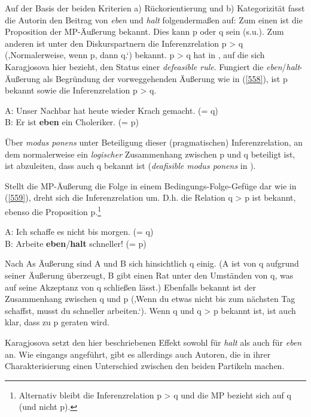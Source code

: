 Auf der Basis der beiden Kriterien a) Rückorientierung und b) Kategorizität fasst die Autorin den Beitrag von \textit{eben} und \textit{halt} folgendermaßen auf: Zum einen ist die Proposition der MP-Äußerung bekannt. Dies kann p oder q sein (s.u.). Zum anderen ist unter den Diskurspartnern die Inferenzrelation p > q (‚Normalerweise, wenn p, dann q.‘) bekannt. p > q hat in \citet{Asher1991}, auf die sich Karagjosova hier bezieht, den Status  einer \textit{defeasible rule}. Fungiert die \textit{eben}/\textit{halt}-Äußerung als Begründung der vorweggehenden Äußerung wie in (\ref{558}), ist p bekannt sowie die Inferenzrelation p > q.
\begin{exe}
	\ex\label{558} 
	A: Unser Nachbar hat heute wieder Krach gemacht. (= q)\\
	B: Er ist \textbf{eben} ein Choleriker. (= p)
\end{exe}
Über \textit{modus ponens} unter Beteiligung dieser (pragmatischen) Inferenzrelation, an dem nor\-malerweise ein \emph{logischer} Zusammenhang zwischen p und q beteiligt ist, ist abzuleiten, dass auch q bekannt ist (\textit{deafisible modus ponens} in \citealt[387]{Asher1991}). 

Stellt die MP-Äußerung die Folge in einem Bedingungs-Folge-Gefüge dar wie in (\ref{559}), dreht sich die Inferenzrelation um. D.h. die Relation q > p ist bekannt, ebenso die Proposition p.\footnote{Alternativ bleibt die Inferenzrelation p > q und die MP bezieht sich auf q (und nicht p).}

\begin{exe}
	\ex\label{559} 
	A: Ich schaffe es nicht bis morgen. (= q)\\
	B: Arbeite \textbf{eben}\slash\textbf{halt} schneller! (= p)
\end{exe}	
Nach As Äußerung sind A und B sich hinsichtlich q einig. (A ist von q aufgrund seiner Äußerung überzeugt, B gibt einen Rat unter den Umständen von q, was auf seine Akzeptanz von q schließen lässt.) Ebenfalls bekannt ist der Zusammenhang zwischen q und p (‚Wenn du etwas nicht bis zum nächsten Tag schaffst, musst du schneller arbeiten.‘). Wenn q und q > p bekannt ist, ist auch klar, dass zu p geraten wird.

Karagjosova setzt den hier beschriebenen Effekt sowohl für \textit{halt} als auch für \textit{eben} an. Wie eingangs angeführt, gibt es allerdings auch Autoren, die in ihrer Charakterisierung einen Unterschied zwischen den beiden Partikeln machen.

